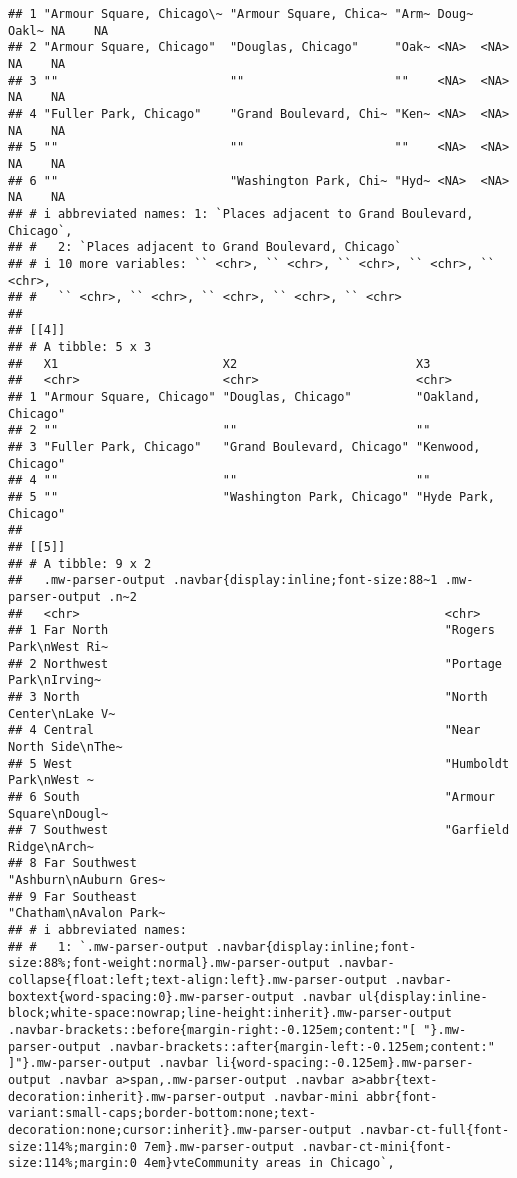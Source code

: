 \documentclass[
]{article}
\begin{document}
\begin{verbatim}
## 1 "Armour Square, Chicago\~ "Armour Square, Chica~ "Arm~ Doug~ Oakl~ NA    NA   
## 2 "Armour Square, Chicago"  "Douglas, Chicago"     "Oak~ <NA>  <NA>  NA    NA   
## 3 ""                        ""                     ""    <NA>  <NA>  NA    NA   
## 4 "Fuller Park, Chicago"    "Grand Boulevard, Chi~ "Ken~ <NA>  <NA>  NA    NA   
## 5 ""                        ""                     ""    <NA>  <NA>  NA    NA   
## 6 ""                        "Washington Park, Chi~ "Hyd~ <NA>  <NA>  NA    NA   
## # i abbreviated names: 1: `Places adjacent to Grand Boulevard, Chicago`,
## #   2: `Places adjacent to Grand Boulevard, Chicago`
## # i 10 more variables: `` <chr>, `` <chr>, `` <chr>, `` <chr>, `` <chr>,
## #   `` <chr>, `` <chr>, `` <chr>, `` <chr>, `` <chr>
## 
## [[4]]
## # A tibble: 5 x 3
##   X1                       X2                         X3                  
##   <chr>                    <chr>                      <chr>               
## 1 "Armour Square, Chicago" "Douglas, Chicago"         "Oakland, Chicago"  
## 2 ""                       ""                         ""                  
## 3 "Fuller Park, Chicago"   "Grand Boulevard, Chicago" "Kenwood, Chicago"  
## 4 ""                       ""                         ""                  
## 5 ""                       "Washington Park, Chicago" "Hyde Park, Chicago"
## 
## [[5]]
## # A tibble: 9 x 2
##   .mw-parser-output .navbar{display:inline;font-size:88~1 .mw-parser-output .n~2
##   <chr>                                                   <chr>                 
## 1 Far North                                               "Rogers Park\nWest Ri~
## 2 Northwest                                               "Portage Park\nIrving~
## 3 North                                                   "North Center\nLake V~
## 4 Central                                                 "Near North Side\nThe~
## 5 West                                                    "Humboldt Park\nWest ~
## 6 South                                                   "Armour Square\nDougl~
## 7 Southwest                                               "Garfield Ridge\nArch~
## 8 Far Southwest                                           "Ashburn\nAuburn Gres~
## 9 Far Southeast                                           "Chatham\nAvalon Park~
## # i abbreviated names:
## #   1: `.mw-parser-output .navbar{display:inline;font-size:88%;font-weight:normal}.mw-parser-output .navbar-collapse{float:left;text-align:left}.mw-parser-output .navbar-boxtext{word-spacing:0}.mw-parser-output .navbar ul{display:inline-block;white-space:nowrap;line-height:inherit}.mw-parser-output .navbar-brackets::before{margin-right:-0.125em;content:"[ "}.mw-parser-output .navbar-brackets::after{margin-left:-0.125em;content:" ]"}.mw-parser-output .navbar li{word-spacing:-0.125em}.mw-parser-output .navbar a>span,.mw-parser-output .navbar a>abbr{text-decoration:inherit}.mw-parser-output .navbar-mini abbr{font-variant:small-caps;border-bottom:none;text-decoration:none;cursor:inherit}.mw-parser-output .navbar-ct-full{font-size:114%;margin:0 7em}.mw-parser-output .navbar-ct-mini{font-size:114%;margin:0 4em}vteCommunity areas in Chicago`,

\end{verbatim}
\end{document}
